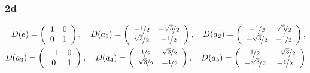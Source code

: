 \documentclass[10pt,a4paper]{article}
\theoremstyle{definition}
\begin{document}
\subsubsection{2d}
\begin{align}
D(e)=\left(\begin{array}{cc}
1 & 0\\
0 & 1
\end{array}
\right),\quad
D(a_1)=\left(\begin{array}{cc}
-\nicefrac{1}{2} & -\nicefrac{\sqrt{3}}{2}\\
 \nicefrac{\sqrt{3}}{2} & -\nicefrac{1}{2}
\end{array}
\right),\quad
D(a_2)=\left(\begin{array}{cc}
-\nicefrac{1}{2} & \nicefrac{\sqrt{3}}{2}\\
-\nicefrac{\sqrt{3}}{2} & -\nicefrac{1}{2}
\end{array}
\right),\\
D(a_3)=\left(\begin{array}{cc}
-1 & 0\\
0 & 1
\end{array}
\right),\quad
D(a_4)=\left(\begin{array}{cc}
\nicefrac{1}{2} & \nicefrac{\sqrt{3}}{2}\\
\nicefrac{\sqrt{3}}{2} & -\nicefrac{1}{2}
\end{array}
\right),\quad
D(a_5)=\left(\begin{array}{cc}
\nicefrac{1}{2} & -\nicefrac{\sqrt{3}}{2}\\
-\nicefrac{\sqrt{3}}{2} & -\nicefrac{1}{2}
\end{array}
\right)
\end{align}


\newpage
\end{document}
